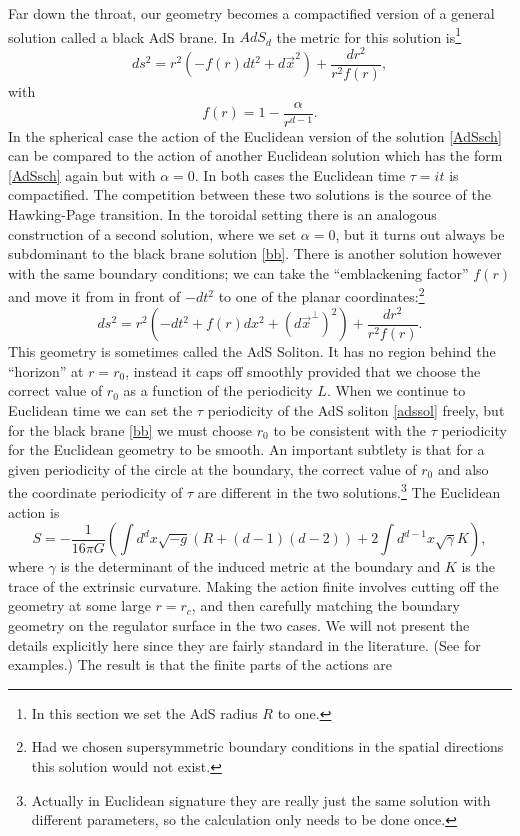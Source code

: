 \documentclass[12pt]{article}
\newcommand{\be}{\begin{equation}}
\newcommand{\ee}{\end{equation}}
\begin{document}
Far down the throat, our geometry becomes a compactified version of a general solution called a black AdS brane.  In $AdS_d$ the metric for this solution is\footnote{In this section we set the AdS radius $R$ to one.}
\be\label{bb}
ds^2=r^2\left(-f(r)dt^2+d\vec{x}^2\right)+\frac{dr^2}{r^2f(r)},
\ee
with 
\be
f(r)=1-\frac{\alpha}{ r^{d-1}}.
\ee
In the spherical case the action of the Euclidean version of the solution \eqref{AdSsch} can be compared to the action of another Euclidean solution which has the form \eqref{AdSsch} again but with $\alpha=0$.  In both cases the Euclidean time $\tau=it$ is compactified.  The competition between these two solutions is the source of the Hawking-Page transition.  In the toroidal setting there is an analogous construction of a second solution, where we set $\alpha=0$, but it turns out always be subdominant to the black brane solution  \eqref{bb}.  There is another solution however with the same boundary conditions; we can take the ``emblackening factor'' $f(r)$ and move it from in front of $-dt^2$ to one of the planar coordinates:\footnote{Had we chosen supersymmetric boundary conditions in the spatial directions this solution would not exist.}
\be\label{adssol}
ds^2=r^2\left(-dt^2+f(r)dx^2+(d\vec{x}^\perp)^2\right)+\frac{dr^2}{r^2f(r)}.
\ee
This geometry is sometimes called the AdS Soliton.  It has no region behind the ``horizon'' at $r=r_0$, instead it caps off smoothly provided that we choose the correct value of $r_0$ as a function of the periodicity $L$.  When we continue to Euclidean time we can set the $\tau$ periodicity of the AdS soliton \eqref{adssol} freely, but for the black brane \eqref{bb} we must choose $r_0$ to be consistent with the $\tau$ periodicity for the Euclidean geometry to be smooth.  An important subtlety is that for a given periodicity of the circle at the boundary, the correct value of $r_0$ and also the coordinate periodicity of $\tau$ are different in the two solutions.\footnote{Actually in Euclidean signature they are really just the same solution with different parameters, so the calculation only needs to be done once.}  The Euclidean action is
\be
S=-\frac{1}{16\pi G}\left(\int d^{d}x \sqrt{-g}\left(R+(d-1)(d-2)\right)+2\int d^{d-1}x \sqrt{\gamma} K\right),
\ee
where $\gamma$ is the determinant of the induced metric at the boundary and $K$ is the trace of the extrinsic curvature.  Making the action finite involves cutting off the geometry at some large $r=r_c$, and then carefully matching the boundary geometry on the regulator surface in the two cases.  We will not present the details explicitly here since they are fairly standard in the literature. (See \cite{Witten:1998zw,Anninos:2012ft} for examples.) The result is that the finite parts of the actions are
\end{document}
